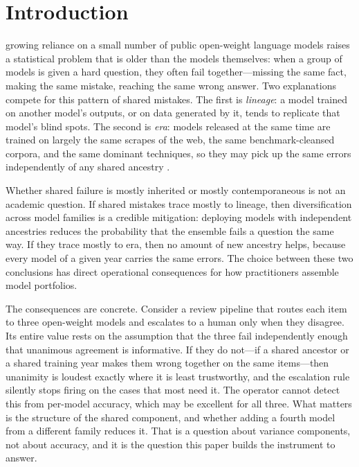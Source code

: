 \documentclass{ieeeaccess}
\theoremstyle{definition}
\theoremstyle{plain}
\begin{document}
\titlepgskip=-21pt

\maketitle

\section{Introduction}
\label{sec:introduction}
 growing reliance on a small number of public open-weight language
models raises a statistical problem that is older than the models themselves:
when a group of models is given a hard question, they often fail together---missing
the same fact, making the same mistake, reaching the same wrong answer. Two
explanations compete for this pattern of shared mistakes. The first is
\emph{lineage}: a model trained on another model's outputs, or on data generated by
it, tends to replicate that model's blind spots. The second is \emph{era}: models
released at the same time are trained on largely the same scrapes of the web, the
same benchmark-cleansed corpora, and the same dominant techniques, so they may pick
up the same errors independently of any shared ancestry \cite{kim2025}.

Whether shared failure is mostly inherited or mostly contemporaneous is not an
academic question. If shared mistakes trace mostly to lineage, then
diversification across model families is a credible mitigation: deploying models
with independent ancestries reduces the probability that the ensemble fails a
question the same way. If they trace mostly to era, then no amount of new ancestry
helps, because every model of a given year carries the same errors. The choice
between these two conclusions has direct operational consequences for how
practitioners assemble model portfolios.

The consequences are concrete. Consider a review pipeline that routes each item
to three open-weight models and escalates to a human only when they disagree.
Its entire value rests on the assumption that the three fail independently
enough that unanimous agreement is informative. If they do not---if a shared
ancestor or a shared training year makes them wrong together on the same
items---then unanimity is loudest exactly where it is least trustworthy, and
the escalation rule silently stops firing on the cases that most need it. The
operator cannot detect this from per-model accuracy, which may be excellent for
all three. What matters is the structure of the shared component, and whether
adding a fourth model from a different family reduces it. That is a question
about variance components, not about accuracy, and it is the question this
paper builds the instrument to answer.
\end{document}
